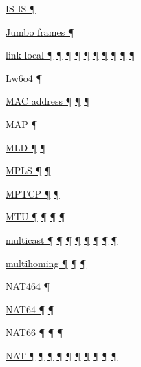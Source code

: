 \documentclass[
]{article}
\begin{document}
\hyperref[routing]{IS-IS ¶}

\hyperref[packet-size-and-jumbo-frames]{Jumbo frames ¶}

\hyperref[address-resolution]{link-local ¶} \hyperref[addresses]{¶}
\hyperref[auto-configuration]{¶} \hyperref[dns]{¶}
\hyperref[source-and-destination-address-selection]{¶}
\hyperref[filtering]{¶} \hyperref[network-design]{¶}
\hyperref[energy-consumption]{¶} \hyperref[multi-prefix-operation]{¶}
\hyperref[deployment-in-the-home]{¶}

\hyperref[translation-and-ipv4-as-a-service]{Lw6o4 ¶}

\hyperref[address-resolution]{MAC address ¶} \hyperref[addresses]{¶}
\hyperref[address-and-prefix-management]{¶}

\hyperref[translation-and-ipv4-as-a-service]{MAP ¶}

\hyperref[address-resolution]{MLD ¶}
\hyperref[layer-2-considerations]{¶}

\hyperref[layer-2-functions]{MPLS ¶} \hyperref[tunnels]{¶}

\hyperref[transport-protocols]{MPTCP ¶} \hyperref[multihoming]{¶}

\hyperref[extension-headers-and-options]{MTU ¶}
\hyperref[layer-2-functions]{¶} \hyperref[packet-format]{¶}
\hyperref[packet-size-and-jumbo-frames]{¶}

\hyperref[address-resolution]{multicast ¶} \hyperref[addresses]{¶}
\hyperref[auto-configuration]{¶} \hyperref[layer-2-functions]{¶}
\hyperref[ipv6-primary-differences-from-ipv4]{¶} \hyperref[filtering]{¶}
\hyperref[layer-2-considerations]{¶} \hyperref[energy-consumption]{¶}

\hyperref[multi-prefix-operation]{multihoming ¶}
\hyperref[multihoming]{¶} \hyperref[deployment-in-the-enterprise]{¶}

\hyperref[translation-and-ipv4-as-a-service]{NAT464 ¶}

\hyperref[dual-stack-scenarios]{NAT64 ¶}
\hyperref[translation-and-ipv4-as-a-service]{¶}

\hyperref[ipv6-primary-differences-from-ipv4]{NAT66 ¶}
\hyperref[translation-and-ipv4-as-a-service]{¶} \hyperref[security]{¶}

\hyperref[transport-protocols]{NAT ¶} \hyperref[dual-stack-scenarios]{¶}
\hyperref[obsolete-techniques]{¶}
\hyperref[translation-and-ipv4-as-a-service]{¶} \hyperref[tunnels]{¶}
\hyperref[security]{¶} \hyperref[topology-obfuscation]{¶}
\hyperref[address-planning]{¶} \hyperref[multihoming]{¶}
\hyperref[deployment-in-the-enterprise]{¶}
\end{document}
